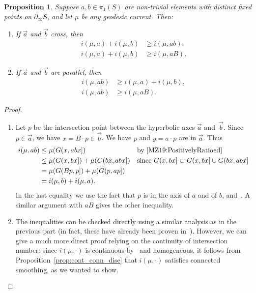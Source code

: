 \documentclass[11pt]{amsart}
\newcommand{\ora}[1]{\overrightarrow{#1}}
\numberwithin{equation}{section}
\numberwithin{figure}{section}
\newtheorem{proposition}[theorem]{Proposition}
\theoremstyle{definition}
\theoremstyle{plain}
\begin{document}
\begin{proposition}\label{prop:smoothing_nec}
Suppose $a,b \in \pi_1(S)$ are non-trivial elements with distinct fixed points on 
$\partial_{\infty} S$, and let $\mu$ be any geodesic current. Then:
\begin{enumerate}
\item If $\ora{a}$ and $\ora{b}$ cross, then
\[
\begin{aligned}
i(\mu,a)+i(\mu,b) &\ge i(\mu,ab),\\
i(\mu,a)+i(\mu,b) &\ge i(\mu,aB).
\end{aligned}
\]
\item If $\ora{a}$ and $\ora{b}$ are parallel, then
\[
\begin{aligned}
i(\mu,ab) &\ge i(\mu,a)+i(\mu,b),\\
i(\mu,ab) &\ge i(\mu,aB).
\end{aligned}
\]
\end{enumerate}
\end{proposition}

\begin{proof}
\begin{enumerate}
\item Let $p$ be the intersection point between the hyperbolic axes $\ora{a}$ and~$\ora{b}$.
Since $p \in \ora{a}$, we have $x=B \cdot p \in \ora{b}$.
We have $p$ and $y= a \cdot p$ are in $\ora{a}$. Thus
\begin{align*}
  i(\mu, ab) &\leq \mu(G(x, ab x]) &&\text{by \cite[Lemma 4.4(2)]{MZ19:PositivelyRatioed}}\\
  &\leq \mu(G(x, b x]) + \mu(G(bx, ab x]) &&\text{since $G(x, b x] \subset G(x, b x] \cup G(bx, ab x]$}\\
             &= \mu(G(B p, p]) + \mu(G(p, ap])\\
               &= i(\mu, b) + i(\mu, a).
\end{align*}
In the last equality we use the fact that $p$ is in the
axis of $a$ and of $b$, and~\cite[Lemma 4.4(1)]{MZ19:PositivelyRatioed}.
A similar argument with $aB$ gives the other inequality.
\item
  The inequalities can be checked directly using a similar analysis as in the previous part (in fact, these have already been proven in~\cite[Proposition~4.5]{MZ19:PositivelyRatioed}).
However, we can give a much more direct proof relying on the continuity of intersection number: since $i(\mu, \cdot)$ is continuous by~\cite[Proposition~4.5]{Bonahon86:EndsHyperbolicManifolds} and homogeneous, it follows from Proposition~\ref{prop:cont_conn_disc} that $i(\mu, \cdot)$ satisfies connected smoothing, as we wanted to show.
\end{enumerate}
\end{proof}









%



\end{document}
